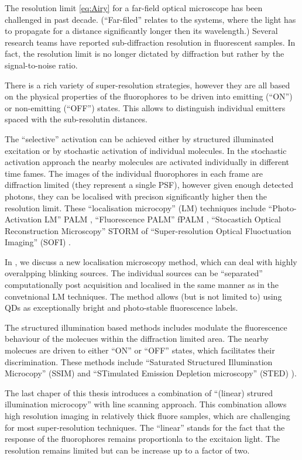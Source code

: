The resolution limit \autoref{eq:Airy} for a far-field optical microscope has been challenged in past decade. (``Far-filed'' relates to the systems, where the light has to propagate for a distance significantly longer then its wavelength.) Several research teams have reported sub-diffraction resolution in fluorescent samples. In fact, the resolution limit is no longer dictated by diffraction but rather by the signal-to-noise ratio. 

There is a rich variety of super-resolution strategies, however they are all based on the physical properties of the fluorophores to be driven into emitting (``ON'') or non-emitting (``OFF'') states. This allows to distinguish individual emitters spaced with the sub-resolutin distances. 

The ``selective'' activation can be achieved either by structured illuminated excitation or by stochastic activation of individual molecules. In the stochastic activation approach the nearby molecules are activated individually in different time fames. The images of the individual fluorophores in each frame are diffraction limited (they represent a single PSF), however given enough detected photons, they can be localised with precison significantly higher then the resolution limit. These ``localisation microcopy'' (LM) techniques include ``Photo-Activation LM'' PALM \cite{Betzig2006}, ``Fluorescence PALM'' fPALM \cite{Hess2006}, ``Stocastich Optical Reconstruction Microscopy'' STORM \cite{Rust2006} of ``Super-resolution Optical Fluoctuation Imaging'' (SOFI) \cite{Dertinger2009}. 

In , we discuss a new localisation microscopy method, which can deal with highly overalpping blinking sources. The individual sources can be ``separated'' computationally post acquisition and localised in the same manner as in the convetnional LM techniques. The method allows (but is not limited to) using QDs as exceptionally bright and photo-stable fluorescence labels.

The structured illumination based methods includes modulate the fluorescence behaviour of the molecues within the diffraction limited area. The nearby molecues are driven to either ``ON'' or ``OFF'' states, which facilitates their discrimination.  These methods include ``Saturated Structured Illumination Microcopy'' (SSIM) \cite{Gustafsson2000,Heintzmann2002} and ``STimulated Emission Depletion microscopy'' (STED) \cite{Hell1994}). 

The last chaper  of this thesis introduces a combination of ``(linear) strured illumination microcopy'' with line scanning approach. This combination allows high resolution imaging in relatively thick fluore samples, which are challenging for most super-resolution techniques. The ``linear'' stands for the fact that the response of the fluorophores remains proportionla to the excitaion light. The resolution remains limited but can be increase up to a factor of two.  


